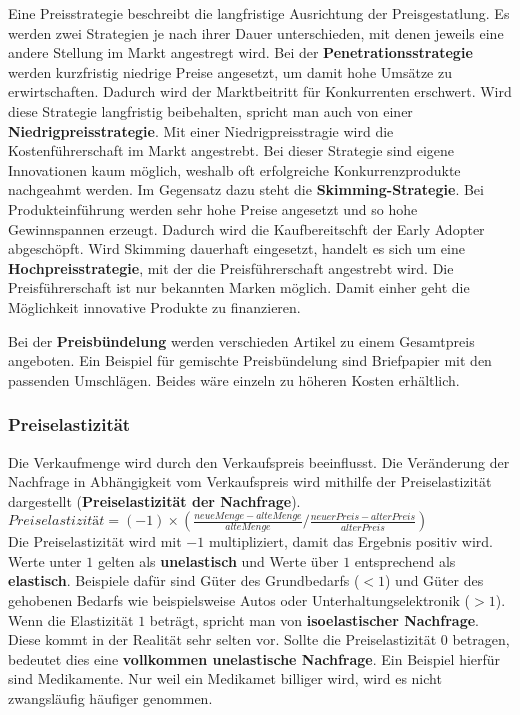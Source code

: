 Eine Preisstrategie beschreibt die langfristige Ausrichtung der Preisgestatlung. Es werden zwei Strategien je nach ihrer Dauer unterschieden, mit denen jeweils eine andere Stellung im Markt angestregt wird. Bei der {\bf Penetrationsstrategie} werden kurzfristig niedrige Preise angesetzt, um damit hohe Umsätze zu erwirtschaften. Dadurch wird der Marktbeitritt für Konkurrenten erschwert. Wird diese Strategie langfristig beibehalten, spricht man auch von einer {\bf Niedrigpreisstrategie}. Mit einer Niedrigpreisstragie wird die Kostenführerschaft im Markt angestrebt. Bei dieser Strategie sind eigene Innovationen kaum möglich, weshalb oft erfolgreiche Konkurrenzprodukte nachgeahmt werden. Im Gegensatz dazu steht die {\bf Skimming-Strategie}. Bei Produkteinführung werden sehr hohe Preise angesetzt und so hohe Gewinnspannen erzeugt. Dadurch wird die Kaufbereitschft der Early Adopter abgeschöpft. Wird Skimming dauerhaft eingesetzt, handelt es sich um eine {\bf Hochpreisstrategie}, mit der die Preisführerschaft angestrebt wird. Die Preisführerschaft ist nur bekannten Marken möglich. Damit einher geht die Möglichkeit innovative Produkte zu finanzieren.

Bei der {\bf Preisbündelung} werden verschieden Artikel zu einem Gesamtpreis angeboten. Ein Beispiel für gemischte Preisbündelung sind Briefpapier mit den passenden Umschlägen. Beides wäre einzeln zu höheren Kosten erhältlich.

\subsubsection{Preiselastizität}

Die Verkaufmenge wird durch den Verkaufspreis beeinflusst. Die Veränderung der Nachfrage in Abhängigkeit vom Verkaufspreis wird mithilfe der Preiselastizität dargestellt ({\bf Preiselastizität der Nachfrage}).\\
$Preiselastizität = (-1)\times(\frac{neue Menge - alte Menge}{alte Menge} / \frac{neuer Preis - alter Preis}{alter Preis})$\\
Die Preiselastizität wird mit $-1$ multipliziert, damit das Ergebnis positiv wird. Werte unter $1$ gelten als {\bf unelastisch} und Werte über $1$ entsprechend als {\bf elastisch}. Beispiele dafür sind Güter des Grundbedarfs ($<1$) und Güter des gehobenen Bedarfs wie beispielsweise Autos oder Unterhaltungselektronik ($>1$). Wenn die Elastizität $1$ beträgt, spricht man von {\bf isoelastischer Nachfrage}. Diese kommt in der Realität sehr selten vor. Sollte die Preiselastizität $0$ betragen, bedeutet dies eine {\bf vollkommen unelastische Nachfrage}. Ein Beispiel hierfür sind Medikamente. Nur weil ein Medikamet billiger wird, wird es nicht zwangsläufig häufiger genommen.

